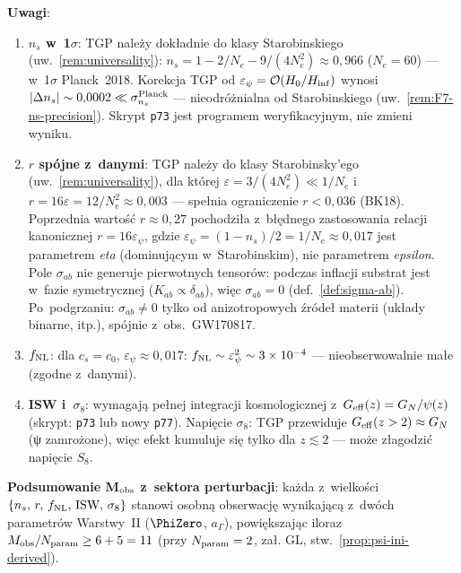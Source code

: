 \begin{remark}
\medskip\noindent
\textbf{Uwagi}:
\begin{enumerate}[nosep]
  \item \textbf{$n_s$ w~1$\sigma$}: TGP nale\.zy dok\l{}adnie do klasy Starobinskiego
    (uw.~\ref{rem:universality}): $n_s = 1 - 2/N_e - 9/(4N_e^2) \approx 0{,}966$ ($N_e=60$)
    --- w~1$\sigma$ Planck~2018.
    Korekcja TGP od $\varepsilon_\psi = \mathcal{O}(H_0/H_{\rm inf})$ wynosi
    $|\Delta n_s| \sim 0{,}0002 \ll \sigma_{n_s}^{\rm Planck}$ ---
    nieodró\.znialna od Starobinskiego (uw.~\ref{rem:F7-ns-precision}).
    Skrypt \texttt{p73} jest programem weryfikacyjnym, nie zmieni wyniku.
  \item \textbf{$r$ sp\'ojne z~danymi}: TGP nale\.zy do klasy Starobinsky'ego
    (uw.~\ref{rem:universality}), dla kt\'orej $\varepsilon = 3/(4N_e^2) \ll 1/N_e$
    i~$r = 16\varepsilon = 12/N_e^2 \approx 0{,}003$ --- spe\l{}nia
    ograniczenie $r < 0{,}036$ (BK18).
    Poprzednia warto\'s\'c $r \approx 0{,}27$ pochodzi\l{}a
    z~b\l{}\k{e}dnego zastosowania relacji kanonicznej $r = 16\varepsilon_\psi$,
    gdzie $\varepsilon_\psi = (1-n_s)/2 = 1/N_e \approx 0{,}017$ jest
    parametrem \emph{eta} (dominuj\k{a}cym w~Starobinskim),
    nie parametrem \emph{epsilon}.
    Pole $\sigma_{ab}$ nie generuje pierwotnych tensor\'ow: podczas inflacji
    substrat jest w~fazie symetrycznej ($K_{ab} \propto \delta_{ab}$),
    wi\k{e}c $\sigma_{ab} = 0$ (def.~\ref{def:sigma-ab}).
    Po~podgrzaniu: $\sigma_{ab} \neq 0$ tylko od anizotropowych \'zr\'ode\l{}
    materii (uk\l{}ady binarne, itp.), sp\'ojnie z~obs.~GW170817.
  \item \textbf{$f_{\rm NL}$}: dla $c_s = c_0$, $\varepsilon_\psi \approx 0{,}017$:
    $f_{\rm NL} \sim \varepsilon_\psi^2 \sim 3 \times 10^{-4}$ ---
    nieobserwowalnie ma\l{}e (zgodne z~danymi).
  \item \textbf{ISW i~$\sigma_8$}: wymagaj\k{a} pe\l{}nej integracji
    kosmologicznej z~$G_{\rm eff}(z) = G_N/\psi(z)$
    (skrypt: \texttt{p73} lub nowy \texttt{p77}).
    Napi\k{e}cie $\sigma_8$: TGP przewiduje
    $G_{\rm eff}(z > 2) \approx G_N$ (ψ zamro\.zone),
    wi\k{e}c efekt kumuluje si\k{e} tylko dla $z \lesssim 2$
    --- mo\.ze z\l{}agodzi\'c napi\k{e}cie $S_8$.
\end{enumerate}

\medskip\noindent
\textbf{Podsumowanie M$_{\rm obs}$ z~sektora perturbacji}:
ka\.zda z~wielko\'sci $\{n_s,\,r,\,f_{\rm NL},\,\text{ISW},\,\sigma_8\}$
stanowi osobn\k{a} obserwacj\k{e} wynikaj\k{a}c\k{a} z~dwóch
parametr\'ow Warstwy~II ($\PhiZero$, $a_\Gamma$),
powi\k{e}kszaj\k{a}c iloraz $M_{\rm obs}/N_{\rm param} \geq 6 + 5 = 11$
(przy $N_{\rm param} = 2$, za\l{}. GL, stw.~\ref{prop:psi-ini-derived}).
\end{remark}

